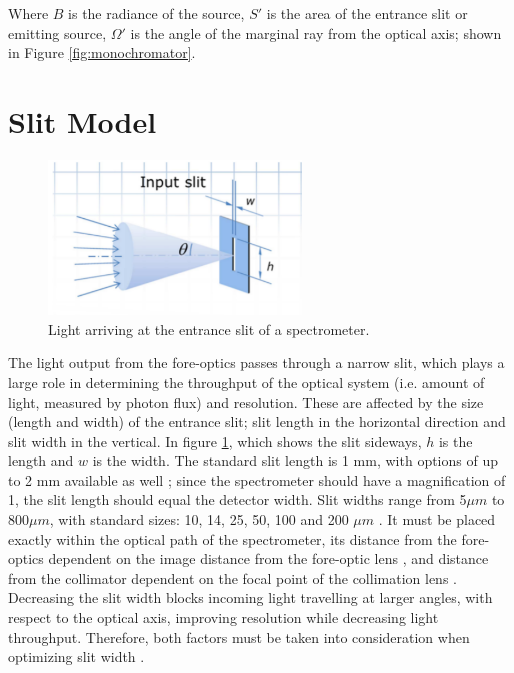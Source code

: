 Where $B$ is the radiance of the source, $S'$ is the area of the entrance slit or emitting source, $\Omega'$ is the angle of the marginal ray from the optical axis; shown in Figure \ref{fig:monochromator}.

\section{Slit Model} 

\begin{figure}[H]
\centering
\includegraphics[width=0.6\textwidth]{figures/entrance slit.PNG}
\caption{Light arriving at the entrance slit of a spectrometer. \cite{Ibsen_photonics_coupling}}
\label{fig:entrance-slit}
\end{figure}

The light output from the fore-optics passes through a narrow slit, which plays a large role in determining the throughput of the optical system (i.e. amount of light, measured by photon flux) and resolution. These are affected by the size (length and width) of the entrance slit; slit length in the horizontal direction and slit width in the vertical. In figure \ref{fig:entrance-slit}, which shows the slit sideways, $h$ is the length and $w$ is the width. The standard slit length is 1 mm, with options of up to 2 mm available as well \cite{B&W_Tek}; since the spectrometer should have a magnification of 1, the slit length should equal the detector width. Slit widths range from 5$\mu m$ to 800$\mu m$, with standard sizes: 10, 14, 25, 50, 100 and 200 $\mu m$ \cite{StellarNet}. It must be placed exactly within the optical path of the spectrometer, its distance from the fore-optics dependent on the image distance from the fore-optic lens \cite{Horiba_entrance_optics}, and distance from the collimator dependent on the focal point of the collimation lens \cite{Ibsen_photonics_design}.\\

Decreasing the slit width blocks incoming light travelling at larger angles, with respect to the optical axis, improving resolution while decreasing light throughput. Therefore, both factors must be taken into consideration when optimizing slit width \cite{Optecks}.

